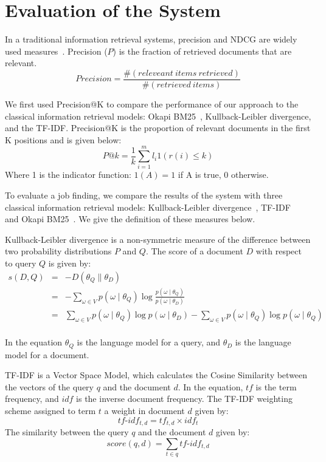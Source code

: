 \section{Evaluation of the System}

In a traditional information retrieval systems, precision and NDCG are widely used measures~\cite{manning2008introduction}. Precision ($P$) is the fraction of retrieved documents that are relevant.
       $$  Precision =  \frac{ \#(releveant~items~ retrieved)}{ \#(retrieved~items)}$$

We first used Precision@K to compare the performance of our approach to the classical information retrieval models: Okapi BM25~\cite{robertson2009probabilistic}, Kullback-Leibler divergence, and the TF-IDF. Precision@K is the proportion of relevant documents in the first K positions and is given below:
$$ P@k = \frac{1}{k} \sum^m_{i=1} l_i 1 \left(  r(i) \leq k  \right )  $$
Where 1 is the indicator function: $1(A) = 1$ if A is true, 0 otherwise.

To evaluate a job finding, we compare the results of the system with three classical information retrieval models: Kullback-Leibler divergence~\cite{zhai2008statistical},  TF-IDF~\cite{manning2008introduction} and Okapi BM25~\cite{robertson1995okapi}. We give the definition of these measures below.

Kullback-Leibler divergence is a non-symmetric measure of the difference between two probability distributions $P$ and $Q$. The score of a document $D$ with respect to query $Q$ is given by:
\begin{equation}
    \begin{array}{rcl}
        s(D,Q) & = & -D( \theta_Q \parallel  \theta_D )\\
               & = &- \sum_{ \omega \in V } p (\omega \mid \theta_Q) \log \frac{ p (\omega \mid \theta_Q )}{p(\omega \mid \theta_D)} \\
               & = & \sum_{ \omega \in V } p (\omega \mid \theta_Q) \log p (\omega \mid \theta_D ) -  \sum_{ \omega \in V } p (\omega \mid \theta_Q) \log p (\omega \mid \theta_Q )  \\

    \end{array}
\end{equation}

In the equation $\theta_Q$ is the language model for a query, and  $\theta_D$ is the language model for a document.

TF-IDF is a Vector Space Model, which calculates the Cosine Similarity between the vectors of the query $q$ and the document $d$. In the equation, $tf$ is the term frequency, and $idf$ is the inverse document frequency. The TF-IDF weighting scheme assigned to term $t$ a weight in document $d$ given by:
$$ tf\text{-}idf_{t,d} = tf_{t,d} \times idf_{t} $$
The similarity between the query $q$ and the document $d$ given by:
$$ score(q,d) =  \sum_{t \in q }  tf\text{-}idf_{t,d} $$

